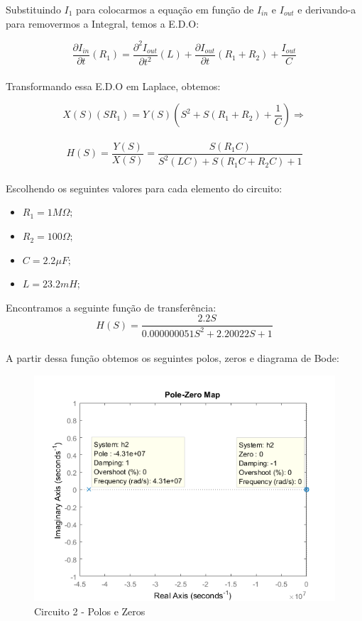 \documentclass[a4paper, 12pt]{article}
\begin{document}
			Substituindo $I_{1}$ para colocarmos a equação em função de $I_{in}$ e $I_{out}$ e derivando-a para removermos a Integral, temos a E.D.O:

			\[
				\frac{\partial I_{in}}{\partial t}\left(R_{1}\right) = \frac{\partial^{2}I_{out}}{\partial t^{2}}\left(L\right) + \frac{\partial I_{out}}{\partial t}\left(R_{1} + R_{2}\right) + \frac{I_{out}}{C}
			\] 	\\

			Transformando essa E.D.O em Laplace, obtemos:

			\[
				X(S)\left(SR_{1}\right) = Y(S)\left(S^{2} + S\left(R_{1} +  R_{2}\right) + \frac{1}{C}\right) \Rightarrow
			\] 	\\
			\[
			H(S) = \frac{Y(S)}{X(S)} = \frac{S\left(R_{1}C\right)}{S^{2}\left(LC\right) + S\left(R_{1}C + R_{2}C\right) + 1}
			\] 	\\

			Escolhendo os seguintes valores para cada elemento do circuito:
			\begin{itemize}
				\item $R_{1} = 1M \Omega;$
				\item $R_{2} = 100 \Omega;$
				\item $C = 2.2\mu F;$
				\item $L = 23.2mH;$				
			\end{itemize}

			Encontramos a seguinte função de transferência:
			\[
				H(S) = \frac{2.2S}{0.000000051S^{2} + 2.20022S + 1}
			\] 	\\
			A partir dessa função obtemos os seguintes polos, zeros e diagrama de Bode:
			\begin{figure}[!ht]
				\centering
				\includegraphics[scale=0.8]{img/1e_circ2.png}
				\caption{Circuito 2 - Polos e Zeros}
			\end{figure}
\end{document}
